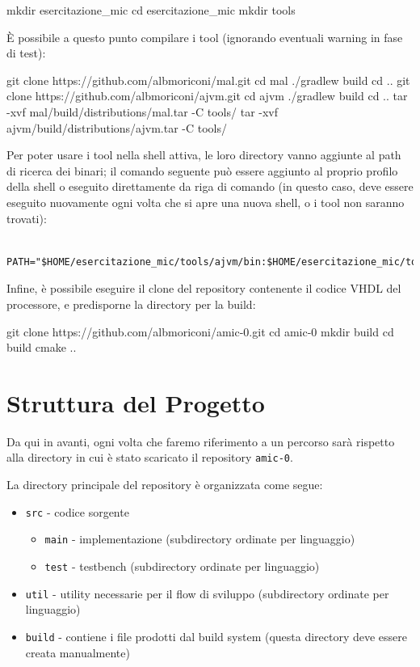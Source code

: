 \documentclass[a4paper,12pt]{scrreprt}
\begin{document}
\begin{commandshell}
mkdir esercitazione_mic
cd esercitazione_mic
mkdir tools
\end{commandshell}

È possibile a questo punto compilare i tool (ignorando eventuali warning in fase
di test):

\begin{commandshell}
git clone https://github.com/albmoriconi/mal.git
cd mal
./gradlew build
cd ..
git clone https://github.com/albmoriconi/ajvm.git
cd ajvm
./gradlew build
cd ..
tar -xvf mal/build/distributions/mal.tar -C tools/
tar -xvf ajvm/build/distributions/ajvm.tar -C tools/
\end{commandshell}

Per poter usare i tool nella shell attiva, le loro directory vanno aggiunte al
path di ricerca dei binari; il comando seguente può essere aggiunto al proprio
profilo della shell o eseguito direttamente da riga di comando (in questo caso,
deve essere eseguito nuovamente ogni volta che si apre una nuova shell, o i tool
non saranno trovati):

\begin{lstlisting}
  PATH="$HOME/esercitazione_mic/tools/ajvm/bin:$HOME/esercitazione_mic/tools/mal/bin:$PATH"
\end{lstlisting}

Infine, è possibile eseguire il clone del repository contenente il codice VHDL
del processore, e predisporne la directory per la build:

\begin{commandshell}
  git clone https://github.com/albmoriconi/amic-0.git
  cd amic-0
  mkdir build
  cd build
  cmake ..
\end{commandshell}

\section{Struttura del Progetto}

Da qui in avanti, ogni volta che faremo riferimento a un percorso sarà rispetto
alla directory in cui è stato scaricato il repository \lstinline{amic-0}.

La directory principale del repository è organizzata come segue:
\begin{itemize}
  \item \lstinline{src} - codice sorgente
  \begin{itemize}
    \item \lstinline{main} - implementazione (subdirectory ordinate per
    linguaggio)
    \item \lstinline{test} - testbench (subdirectory ordinate per linguaggio)
  \end{itemize}
  \item \lstinline{util} - utility necessarie per il flow di sviluppo
  (subdirectory ordinate per linguaggio)
  \item \lstinline{build} - contiene i file prodotti dal build system (questa
  directory deve essere creata manualmente)
\end{itemize}
\end{document}

